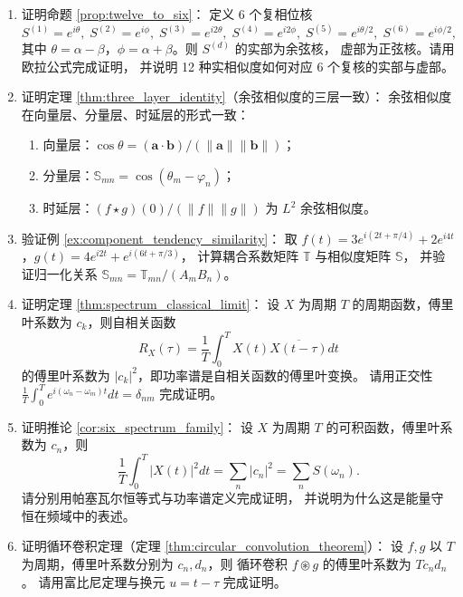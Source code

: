 \begin{enumerate}[leftmargin=3em, label=\textbf{题 \arabic*}]
    \item 证明命题 \ref{prop:twelve_to_six}：
    定义 6 个复相位核
    \[
    S^{(1)}=e^{i\theta},\;S^{(2)}=e^{i\phi},\;S^{(3)}=e^{i2\theta},\;
    S^{(4)}=e^{i2\phi},\;S^{(5)}=e^{i\theta/2},\;S^{(6)}=e^{i\phi/2},
    \]
    其中 $\theta=\alpha-\beta$，$\phi=\alpha+\beta$。则 $S^{(d)}$ 的实部为余弦核，
    虚部为正弦核。请用欧拉公式完成证明，
    并说明 12 种实相似度如何对应 6 个复核的实部与虚部。

    \item 证明定理 \ref{thm:three_layer_identity}（余弦相似度的三层一致）：
    余弦相似度在向量层、分量层、时延层的形式一致：
    \begin{enumerate}[label=(\roman*)]
        \item 向量层：$\cos\theta=(\mathbf{a}\cdot\mathbf{b})/(\|\mathbf{a}\|\|\mathbf{b}\|)$；
        \item 分量层：$\mathbb{S}_{mn}=\cos(\theta_m-\varphi_n)$；
        \item 时延层：$(f\star g)(0)/(\|f\|\|g\|)$ 为 $L^2$ 余弦相似度。
    \end{enumerate}

    \item 验证例 \ref{ex:component_tendency_similarity}：
    取 $f(t)=3e^{i(2t+\pi/4)}+2e^{i4t}$，$g(t)=4e^{i2t}+e^{i(6t+\pi/3)}$，
    计算耦合系数矩阵 $\mathbb{T}$ 与相似度矩阵 $\mathbb{S}$，
    并验证归一化关系 $\mathbb{S}_{mn}=\mathbb{T}_{mn}/(A_mB_n)$。

    \item 证明定理 \ref{thm:spectrum_classical_limit}：
    设 $X$ 为周期 $T$ 的周期函数，傅里叶系数为 $c_k$，则自相关函数
    \[
    R_X(\tau)=\frac1T\int_0^TX(t)\overline{X(t-\tau)}dt
    \]
    的傅里叶系数为 $|c_k|^2$，即功率谱是自相关函数的傅里叶变换。
    请用正交性 $\frac1T\int_0^Te^{i(\omega_n-\omega_m)t}dt=\delta_{nm}$ 完成证明。

    \item 证明推论 \ref{cor:six_spectrum_family}：
    设 $X$ 为周期 $T$ 的可积函数，傅里叶系数为 $c_n$，则
    \[
    \frac1T\int_0^T|X(t)|^2dt=\sum_n|c_n|^2=\sum_nS(\omega_n).
    \]
    请分别用帕塞瓦尔恒等式与功率谱定义完成证明，
    并说明为什么这是能量守恒在频域中的表述。

    \item 证明循环卷积定理（定理 \ref{thm:circular_convolution_theorem}）：
    设 $f,g$ 以 $T$ 为周期，傅里叶系数分别为 $c_n,d_n$，则
    循环卷积 $f\circledast g$ 的傅里叶系数为 $Tc_nd_n$。
    请用富比尼定理与换元 $u=t-\tau$ 完成证明。


\end{enumerate}
